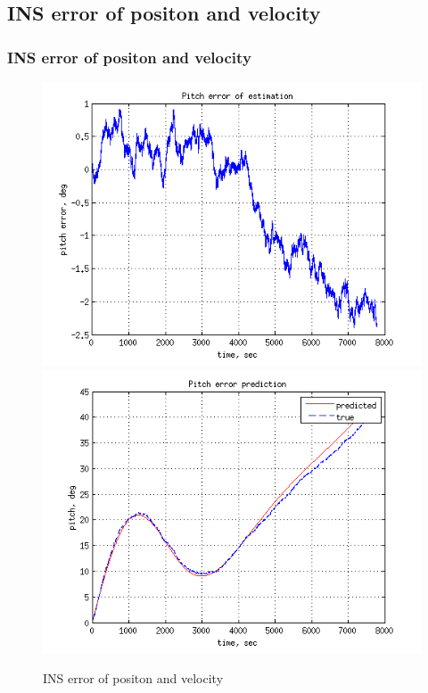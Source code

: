 \documentclass[compress]{beamer}    %
\begin{document}
\subsection{INS error of positon and velocity}
\begin{frame}
\frametitle{INS error of positon and velocity}
\noindent

\begin{figure}[l]
  \centering
  \includegraphics[scale=0.41]{theta_err_of_err}
  \includegraphics[scale=0.41]{theta_err}
  \caption{INS error of positon and velocity}
  \label{fig:comp_pos}
\end{figure}
\end{frame}
\end{document}
